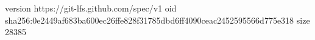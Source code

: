 version https://git-lfs.github.com/spec/v1
oid sha256:0e2449af683ba600ec26ffe828f31785dbd6ff4090ceac2452595566d775e318
size 28385
